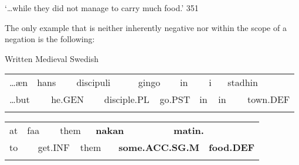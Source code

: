 \begin{styleTranslation}
 ‘…while they did not manage to carry much food.’ 351

\end{styleTranslation}

\begin{styleBodyTextFirst}
The only example that is neither inherently negative nor within the scope of a negation is the following:

\end{styleBodyTextFirst}

\begin{listWWNumileveli}
\item 

\begin{styleExample}
\label{bkm:Ref78603365}Written Medieval Swedish

\end{styleExample}

\end{listWWNumileveli}

\begin{tabular}{llllllllllllll}
\lsptoprule
…æn & \multicolumn{2}{l}{hans

} & \multicolumn{2}{l}{discipuli

} & \multicolumn{2}{l}{gingo

} & \multicolumn{2}{l}{in

} & \multicolumn{2}{l}{i

} & \multicolumn{2}{l}{stadhin

} & \\
\multicolumn{2}{l}{…but

} & \multicolumn{2}{l}{he.GEN

} & \multicolumn{2}{l}{disciple.PL

} & \multicolumn{2}{l}{go.PST

} & \multicolumn{2}{l}{in

} & \multicolumn{2}{l}{in

} & \multicolumn{2}{l}{town.DEF

}\\
\lspbottomrule
\end{tabular}

\begin{tabular}{llllllllll}
\lsptoprule
at & \multicolumn{2}{l}{faa

} & \multicolumn{2}{l}{them

} & \multicolumn{2}{l}{{\bfseries nakan}

} & \multicolumn{2}{l}{{\bfseries matin.}

} & \\
\multicolumn{2}{l}{to

} & \multicolumn{2}{l}{get.INF

} & \multicolumn{2}{l}{them

} & \multicolumn{2}{l}{{\bfseries some.ACC.SG.M}

} & \multicolumn{2}{l}{{\bfseries food.DEF}

}\\
\lspbottomrule
\end{tabular}

